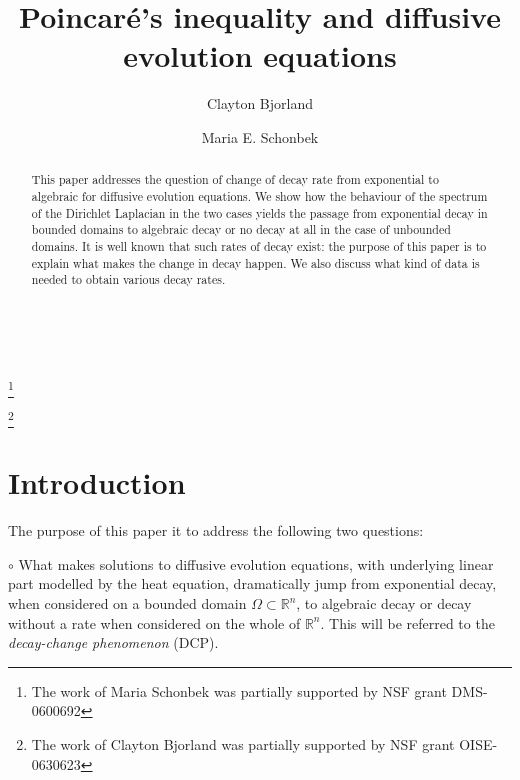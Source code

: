 \documentclass{amsart}
\numberwithin{Theorem}{section}
\numberwithin{equation}{section}
\theoremstyle{definition}
\theoremstyle{remark}
\begin{document}
\title[Poincar\'e's inequality and diffusive evolution equations]{Poincar\'e's inequality and diffusive evolution equations}

\author[Clayton Bjorland ]{Clayton Bjorland }

\address{Department of Mathematics, UC Santa Cruz, Santa Cruz, CA 95064, USA}

\author[Maria E. Schonbek ]{Maria E. Schonbek }

\address{Department of Mathematics, UC Santa Cruz, Santa Cruz, CA 95064, USA}


 \

\thanks{The work of Maria Schonbek was partially supported by NSF grant DMS-0600692}

\thanks{The work of Clayton Bjorland was partially supported by NSF grant OISE-0630623}

\begin{abstract}

This paper addresses the question of change of decay rate from exponential to algebraic for diffusive evolution equations. We show how the behaviour of the spectrum of the Dirichlet Laplacian in the two cases yields the passage from exponential decay in bounded domains to algebraic decay or no decay at all in the case of unbounded domains.  It is well known that such rates of decay exist: the purpose of this paper is to explain what makes the change in decay happen. We also discuss what kind of data is needed to obtain various decay rates.

\end{abstract}

\maketitle

\bigskip

\section{Introduction}

The purpose of this paper it to address the following two questions:

$\circ$  What makes solutions to diffusive evolution equations, with underlying linear part modelled by the heat equation, dramatically jump from exponential decay, when considered on a bounded domain $\Omega \subset    \mathbb{R}^n$, to algebraic decay or decay without a rate when considered on the whole of $\mathbb{R}^n$. This will be referred to the {\em decay-change phenomenon} (DCP).
\end{document}
